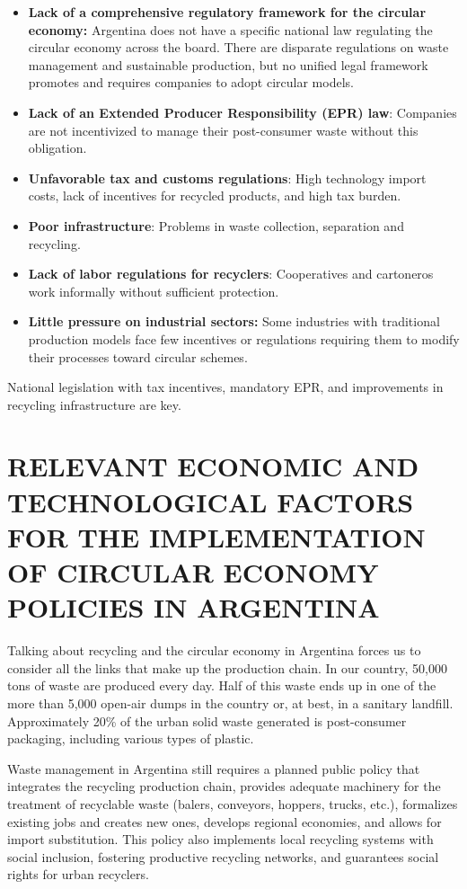 \documentclass[
  12pt,
  oneside]{book}
\providecommand{\tightlist}{%
  \setlength{\itemsep}{0pt}\setlength{\parskip}{0pt}}
\begin{document}
\begin{itemize}
\tightlist
\item
  \textbf{Lack of a comprehensive regulatory framework for the circular
  economy: }Argentina does not have a specific national law regulating
  the circular economy across the board. There are disparate regulations
  on waste management and sustainable production, but no unified legal
  framework promotes and requires companies to adopt circular models.
\item
  \textbf{Lack of an Extended Producer Responsibility (EPR) law}:
  Companies are not incentivized to manage their post-consumer waste
  without this obligation.
\item
  \textbf{Unfavorable tax and customs regulations}: High technology
  import costs, lack of incentives for recycled products, and high tax
  burden.
\item
  \textbf{Poor infrastructure}: Problems in waste collection, separation
  and recycling.
\item
  \textbf{Lack of labor regulations for recyclers}: Cooperatives and
  cartoneros work informally without sufficient protection.
\item
  \textbf{Little pressure on industrial sectors: }Some industries with
  traditional production models face few incentives or regulations
  requiring them to modify their processes toward circular schemes.
\end{itemize}

National legislation with tax incentives, mandatory EPR, and
improvements in recycling infrastructure are key.

\section{RELEVANT ECONOMIC AND TECHNOLOGICAL FACTORS FOR THE
IMPLEMENTATION OF CIRCULAR ECONOMY POLICIES IN
ARGENTINA}\label{relevant-economic-and-technological-factors-for-the-implementation-of-circular-economy-policies-in-argentina}

Talking about recycling and the circular economy in Argentina forces us
to consider all the links that make up the production chain. In our
country, 50,000 tons of waste are produced every day. Half of this waste
ends up in one of the more than 5,000 open-air dumps in the country or,
at best, in a sanitary landfill. Approximately 20\% of the urban solid
waste generated is post-consumer packaging, including various types of
plastic.

Waste management in Argentina still requires a planned public policy
that integrates the recycling production chain, provides adequate
machinery for the treatment of recyclable waste (balers, conveyors,
hoppers, trucks, etc.), formalizes existing jobs and creates new ones,
develops regional economies, and allows for import substitution. This
policy also implements local recycling systems with social inclusion,
fostering productive recycling networks, and guarantees social rights
for urban recyclers.
\end{document}
